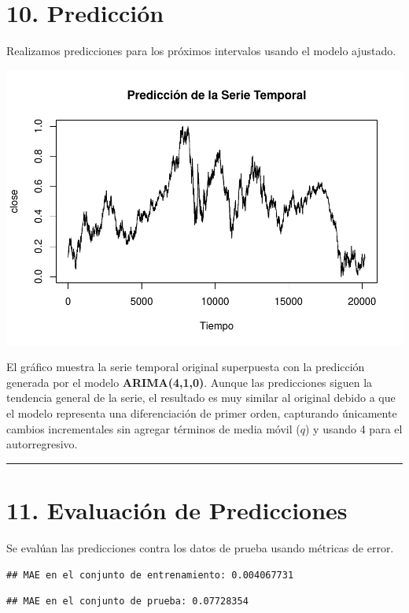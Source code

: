 \documentclass[
]{book}
\begin{document}
\section{10. Predicción}\label{predicciuxf3n}

Realizamos predicciones para los próximos intervalos usando el modelo ajustado.

\includegraphics{bookdown_time_series_files/figure-latex/forecast-1.pdf}

El gráfico muestra la serie temporal original superpuesta con la predicción generada por el modelo \textbf{ARIMA(4,1,0)}. Aunque las predicciones siguen la tendencia general de la serie, el resultado es muy similar al original debido a que el modelo representa una diferenciación de primer orden, capturando únicamente cambios incrementales sin agregar términos de media móvil (\(q\)) y usando 4 para el autorregresivo.

\begin{center}\rule{0.5\linewidth}{0.5pt}\end{center}

\section{11. Evaluación de Predicciones}\label{evaluaciuxf3n-de-predicciones}

Se evalúan las predicciones contra los datos de prueba usando métricas de error.

\begin{verbatim}
## MAE en el conjunto de entrenamiento: 0.004067731
\end{verbatim}

\begin{verbatim}
## MAE en el conjunto de prueba: 0.07728354
\end{verbatim}
\end{document}

